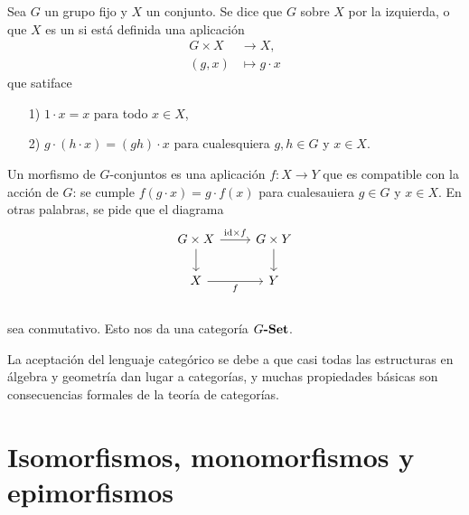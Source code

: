 \documentclass{article}
\numberwithin{equation}{section}
\theoremstyle{definition}
\begin{document}
\begin{ejemplo}
  Sea $G$ un grupo fijo y $X$ un conjunto. Se dice que $G$  sobre
  $X$ por la izquierda, o que $X$ es un  si está definida una
  aplicación
  \begin{align*}
    G\times X & \to X,\\
    (g,x) & \mapsto g\cdot x
  \end{align*}
  que satiface
  \begin{enumerate}
  \item[1)] $1\cdot x = x$ para todo $x\in X$,
  \item[2)] $g\cdot (h\cdot x) = (gh)\cdot x$ para cualesquiera $g,h\in G$ y
    $x\in X$.
  \end{enumerate}

  Un morfismo de $G$-conjuntos es una aplicación $f\colon X\to Y$ que es
  compatible con la acción de $G$: se cumple $f (g\cdot x) = g\cdot f (x)$ para
  cualesauiera $g\in G$ y $x\in X$. En otras palabras, se pide que el diagrama
  \[ \begin{tikzcd}
      G\times X\ar{r}{\idid\times f}\ar{d} & G\times Y\ar{d} \\
      X\ar{r}[swap]{f} & Y \\
    \end{tikzcd} \]
  sea conmutativo. Esto nos da una categoría $G\text{\bf -Set}$.
\end{ejemplo}

La aceptación del lenguaje categórico se debe a que casi todas las estructuras
en álgebra y geometría dan lugar a categorías, y muchas propiedades básicas son
consecuencias formales de la teoría de categorías.


\section{Isomorfismos, monomorfismos y epimorfismos}
\end{document}
